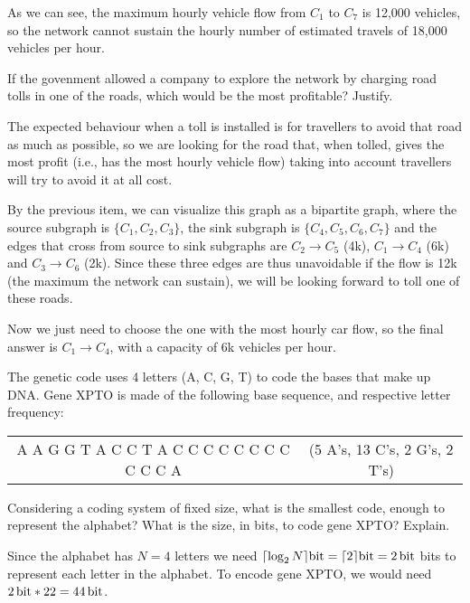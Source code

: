 {As we can see, the maximum hourly vehicle flow from $C_1$ to $C_7$ is 12,000 vehicles, so the network cannot sustain the hourly number of estimated travels of 18,000 vehicles per hour.

If the govenment allowed a company to explore the network by charging road tolls in one of the roads, which would be the most profitable? Justify.

\ansseparator

The expected behaviour when a toll is installed is for travellers to avoid that road as much as possible, so we are looking for the road that, when tolled, gives the most profit (i.e., has the most hourly vehicle flow) taking into account travellers will try to avoid it at all cost.

By the previous item, we can visualize this graph as a bipartite graph, where the source subgraph is $\{C_1, C_2, C_3\}$, the sink subgraph is $\{C_4, C_5, C_6, C_7\}$ and the edges that cross from source to sink subgraphs are $C_2 \rightarrow C_5$ (4k), $C_1 \rightarrow C_4$ (6k) and $C_3 \rightarrow C_6$ (2k). Since these three edges are thus unavoidable if the flow is 12k (the maximum the network can sustain), we will be looking forward to toll one of these roads.

Now we just need to choose the one with the most hourly car flow, so the final answer is $C_1 \rightarrow C_4$, with a capacity of 6k vehicles per hour.

The genetic code uses 4 letters (A, C, G, T) to code the bases that make up DNA. Gene XPTO is made of the following base sequence, and respective letter frequency:
\begin{center}\begin{tabular}{c c}
    A A G G T A C C T A C C C C C C C C C C C A & (5 A's, 13 C's, 2 G's, 2 T's)
\end{tabular}\end{center}

Considering a coding system of fixed size, what is the smallest code, enough to represent the alphabet? What is the size, in bits, to code gene XPTO? Explain.

\ansseparator

Since the alphabet has $N=4$ letters we need $\lceil \log_2 {N} \rceil \SI{}{\bit} = \lceil 2 \rceil \SI{}{\bit} = \SI{2}{\bit}$ bits to represent each letter in the alphabet. To encode gene XPTO, we would need $\SI{2}{\bit}*22=\SI{44}{\bit}$.

}
